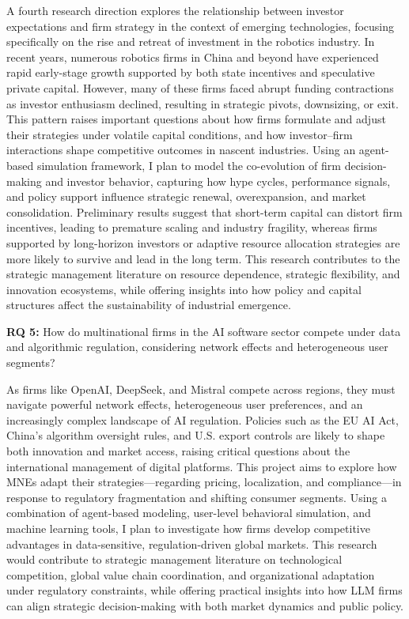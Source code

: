 \documentclass[11pt,a4paper]{article}
\begin{document}
A fourth research direction explores the relationship between investor expectations and firm strategy in the context of emerging technologies, focusing specifically on the rise and retreat of investment in the robotics industry. In recent years, numerous robotics firms in China and beyond have experienced rapid early-stage growth supported by both state incentives and speculative private capital. However, many of these firms faced abrupt funding contractions as investor enthusiasm declined, resulting in strategic pivots, downsizing, or exit. This pattern raises important questions about how firms formulate and adjust their strategies under volatile capital conditions, and how investor–firm interactions shape competitive outcomes in nascent industries. Using an agent-based simulation framework, I plan to model the co-evolution of firm decision-making and investor behavior, capturing how hype cycles, performance signals, and policy support influence strategic renewal, overexpansion, and market consolidation. Preliminary results suggest that short-term capital can distort firm incentives, leading to premature scaling and industry fragility, whereas firms supported by long-horizon investors or adaptive resource allocation strategies are more likely to survive and lead in the long term. This research contributes to the strategic management literature on resource dependence, strategic flexibility, and innovation ecosystems, while offering insights into how policy and capital structures affect the sustainability of industrial emergence.

\textbf{RQ 5:} How do multinational firms in the AI software sector compete under data and algorithmic regulation, considering network effects and heterogeneous user segments?

As firms like OpenAI, DeepSeek, and Mistral compete across regions, they must navigate powerful network effects, heterogeneous user preferences, and an increasingly complex landscape of AI regulation. Policies such as the EU AI Act, China’s algorithm oversight rules, and U.S. export controls are likely to shape both innovation and market access, raising critical questions about the international management of digital platforms. This project aims to explore how MNEs adapt their strategies—regarding pricing, localization, and compliance—in response to regulatory fragmentation and shifting consumer segments. Using a combination of agent-based modeling, user-level behavioral simulation, and machine learning tools, I plan to investigate how firms develop competitive advantages in data-sensitive, regulation-driven global markets. This research would contribute to strategic management literature on technological competition, global value chain coordination, and organizational adaptation under regulatory constraints, while offering practical insights into how LLM firms can align strategic decision-making with both market dynamics and public policy.
\end{document}
